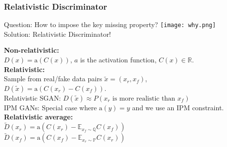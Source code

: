 \documentclass[t]{beamer}
\begin{document}
\begin{frame}
	\frametitle{Relativistic Discriminator}
	Question: How to impose the key missing property? \texttt{[image: why.png]} \\
	Solution: Relativistic Discriminator! \vspace{.25cm}
	
	\textbf{Non-relativistic:} \\ $D(x)=\text{a}(C(x))$, $a$ is the activation function, $C(x) \in \mathbb{R}$. \\ \vspace{.10cm}
	\textbf{Relativistic:} \\ Sample from real/fake data pairs $\tilde{x}=(x_r,x_f)$, $D(\tilde{x}) = \text{a}(C(x_r)-C(x_f))$. \\
	Relativistic SGAN: $D(\tilde{x}) \approx P(x_r \text{ is more realistic than } x_f)$ \\
	IPM GANs: Special case where $\text{a}(y)=y$ and we use an IPM constraint. \\ \vspace{.10cm}
	\textbf{Relativistic average:} \\ 
	$\tilde{D}(x_r)=\text{a} \left( C(x_r)-\mathbb{E}_{x_f \sim \mathbb{Q}} C(x_f) \right)$ \\ $\tilde{D}(x_f)=\text{a} \left( C(x_f)-\mathbb{E}_{x_r \sim \mathbb{P}} C(x_r) \right)$ \\ \vspace{.25cm}
	
\end{frame}

\end{document}
